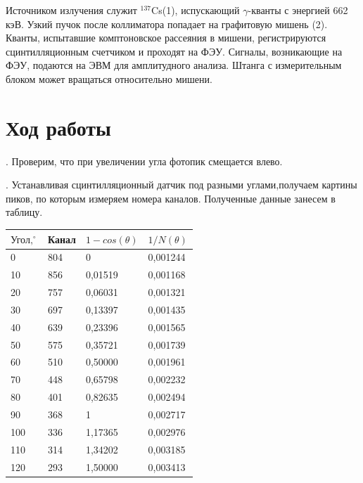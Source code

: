\documentclass[a4paper,12pt]{article} %
\begin{document}
\noindent Источником излучения служит $^{137}$Cs(1), испускающий  $\gamma$-кванты с энергией 662 кэВ. Узкий пучок после коллиматора попадает на графитовую мишень (2). Кванты, испытавшие комптоновское рассеяния в мишени, регистрируются сцинтилляционным счетчиком и проходят на ФЭУ. Сигналы, возникающие на ФЭУ, подаются на ЭВМ для амплитудного анализа. Штанга с измерительным блоком может вращаться относительно мишени.

\section{Ход работы}

. Проверим, что при увеличении угла фотопик смещается влево.

\medskip

. Устанавливая сцинтилляционный датчик под разными углами,получаем картины пиков, по которым измеряем номера каналов. Полученные данные занесем в таблицу.

\medskip

\begin{table}[h!]
\begin{tabular}{|l|l|l|l|}
\hline
$\text{Угол},  ^\circ$ & Канал & $1 - cos(\theta)$ & $1/N(\theta)$ \\ \hline
0                      & 804   & 0                 & 0,001244      \\ \hline
10                     & 856   & 0,01519           & 0,001168      \\ \hline
20                     & 757   & 0,06031           & 0,001321      \\ \hline
30                     & 697   & 0,13397           & 0,001435      \\ \hline
40                     & 639   & 0,23396           & 0,001565      \\ \hline
50                     & 575   & 0,35721           & 0,001739      \\ \hline
60                     & 510   & 0,50000           & 0,001961      \\ \hline
70                     & 448   & 0,65798           & 0,002232      \\ \hline
80                     & 401   & 0,82635           & 0,002494      \\ \hline
90                     & 368   & 1                 & 0,002717      \\ \hline
100                    & 336   & 1,17365           & 0,002976      \\ \hline
110                    & 314   & 1,34202           & 0,003185      \\ \hline
120                    & 293   & 1,50000           & 0,003413      \\ \hline
\end{tabular}
\end{table}
\end{document}
